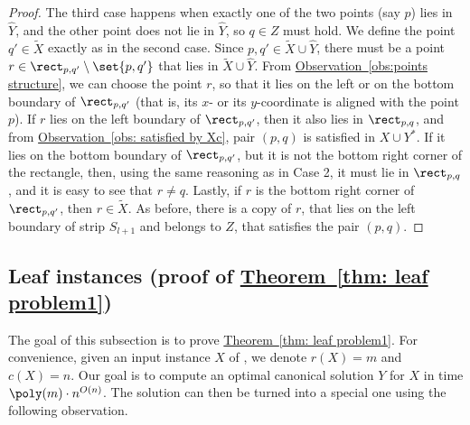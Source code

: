 \documentclass[11pt]{article}
\numberwithin{equation}{section}
\theoremstyle{definition}
\theoremstyle{plain}
\newcommand{\expref}[2]{\hyperref[#2]{#1~\ref{#2}}}
\begin{document}
\begin{proof}
The third case happens when exactly one of the two points (say $p$) lies in $\hat Y$, and the other point does not lie in $\hat Y$, so $q\in Z$ must hold. We define  the point $q'\in \widetilde{X}$ exactly as in the second case. Since $p,q'\in \widetilde{X}\cup \hat Y$, there must be a point $r\in \rect_{p,q'}\setminus\set{p,q'}$ that lies in $\widetilde{X}\cup \hat Y$. From \expref{Observation}{obs:points structure}, we can choose the point $r$, so that it lies on the left or on the bottom boundary of $\rect_{p,q'}$ (that is, its $x$- or its $y$-coordinate is aligned with the point $p$). If $r$ lies on the left boundary of $\rect_{p,q'}$, then it also lies in $\rect_{p,q}$, and from \expref{Observation}{obs: satisfied by Xc}, pair $(p,q)$ is satisfied in $X\cup Y^*$. If it lies on the bottom boundary of $\rect_{p,q'}$, but it is not the bottom right corner of the rectangle, then, using the same reasoning as in Case 2, it must lie in $\rect_{p,q}$, and it is easy to see that $r\neq q$. Lastly, if $r$ is the bottom right corner of $\rect_{p,q'}$, then $r\in \widetilde{X}$. As before, there is a copy of $r$, that lies on the left boundary of strip $S_{l+1}$ and belongs to $Z$, that satisfies the pair $(p,q)$. 
\end{proof}

\subsection{Leaf instances (proof of \expref{Theorem}{thm: leaf problem1})}
\label{sec: leaf problem}


The goal of this subsection is to prove \expref{Theorem}{thm: leaf problem1}. For convenience, given an input instance $X$ of \minsat, we denote $r(X)=m$ and $c(X)=n$. Our goal is to compute an optimal canonical solution $Y$ for $X$ in time $\poly(m)\cdot n^{O(n)}$. The solution can then be turned into a special one using the following observation. 
\end{document}
